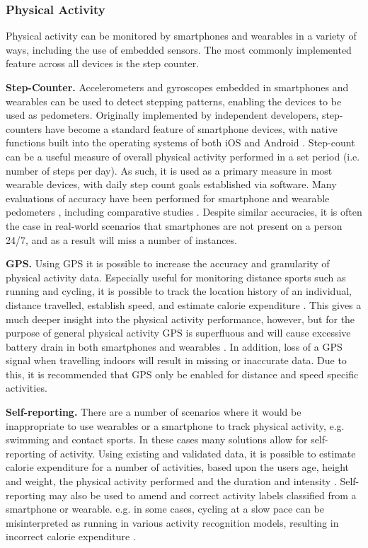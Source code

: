 \subsubsection{Physical Activity}
Physical activity can be monitored by smartphones and wearables in a variety of ways, including the use of embedded sensors. The most commonly implemented feature across all devices is the step counter.

\textbf{Step-Counter.}
Accelerometers and gyroscopes embedded in smartphones and wearables can be used to detect stepping patterns, enabling the devices to be used as pedometers. Originally implemented by independent developers, step-counters have become a standard feature of smartphone devices, with native functions built into the operating systems of both iOS and Android \cite{Orr2015}. Step-count can be a useful measure of overall physical activity performed in a set period (i.e. number of steps per day). As such, it is used as a primary measure in most wearable devices, with daily step count goals established via software. Many evaluations of accuracy have been performed for smartphone and wearable pedometers \cite{Cleland2012, Cleland2013, Yang2010}, including comparative studies \cite{El-Amrawy2015}. Despite similar accuracies, it is often the case in real-world scenarios that smartphones are not present on a person 24/7, and as a result will miss a number of instances.

\textbf{GPS.}
Using GPS it is possible to increase the accuracy and granularity of physical activity data. Especially useful for monitoring distance sports such as running and cycling, it is possible to track the location history of an individual, distance travelled, establish speed, and estimate calorie expenditure \cite{Zhan2012, BUTTE2012}. This gives a much deeper insight into the physical activity performance, however, but for the purpose of general physical activity GPS is superfluous and will cause excessive battery drain in both smartphones and wearables \cite{BUTTE2012}. In addition, loss of a GPS signal when travelling indoors will result in missing or inaccurate data. Due to this, it is recommended that GPS only be enabled for distance and speed specific activities.

\textbf{Self-reporting.}
There are a number of scenarios where it would be inappropriate to use wearables or a smartphone to track physical activity, e.g. swimming and contact sports. In these cases many solutions allow for self-reporting of activity. Using existing and validated data, it is possible to estimate calorie expenditure for a number of activities, based upon the users age, height and weight, the physical activity performed and the duration and intensity \cite{Black1996}. Self-reporting may also be used to amend and correct activity labels classified from a smartphone or wearable. e.g. in some cases, cycling at a slow pace can be misinterpreted as running in various activity recognition models, resulting in incorrect calorie expenditure \cite{Ferguson2015}.


